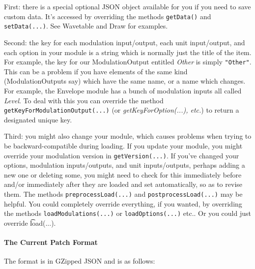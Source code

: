 \documentclass{article}
\begin{document}
First: there is a special optional JSON object available for you if you need to save custom data.  It's accessed by overriding the methods {\tt getData()} and {\tt setData(...)}.  See Wavetable and Draw for examples.

Second: the key for each modulation input/output, each unit input/output, and each option in your module is a string which is normally just the title of the item.  For example, the key for our ModulationOutput entitled {\it Other} is simply {\tt "Other"}.  This can be a problem if you have elements of the same kind (ModulationOutputs say) which have the same name, or a name which changes.  For example, the Envelope module has a bunch of modulation inputs all called {\it Level}.  To deal with this you can override the method {\tt getKeyForModulationOutput(...)} (or {\it getKeyForOption(...), etc.}) to return a designated unique key.

Third: you might also change your module, which causes problems when trying to be backward-compatible during loading.  If you update your module, you might override your modulation version in {\tt getVersion(...)}.  If you've changed your options, modulation inputs/outputs, and unit inputs/outputs, perhaps adding a new one or deleting some, you might need to check for this immediately before and/or immediately after they are loaded and set automatically, so as to revise them.  The methods {\tt preprocessLoad(...)} and {\tt postprocessLoad(...)} may be helpful.  You could completely override everything, if you wanted, by overriding the methods {\tt loadModulations(...)} or {\tt loadOptions(...)} etc..   Or you could just override {\t load(...)}.

\paragraph{The Current Patch Format}  The format is in GZipped JSON and is as follows:
\end{document}
